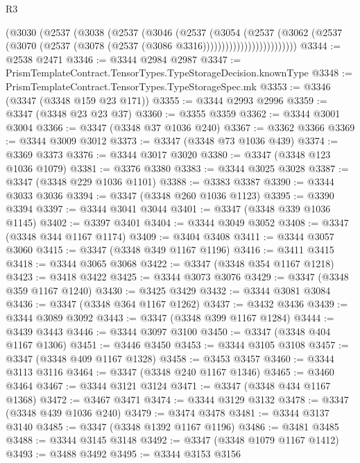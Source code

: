 \begin{lexlean}{R3}
\begin{coremodule}
                        (@3030
                          (@2537
                            (@3038
                              (@2537
                                (@3046
                                  (@2537
                                    (@3054
                                      (@2537
                                        (@3062
                                          (@2537
                                            (@3070
                                              (@2537
                                                (@3078 (@2537 (@3086 @3316)))))))))))))))))))))))))
@3344 := @2538 @2471
@3346 := @3344 @2984 @2987
@3347 := PrismTemplateContract.TensorTypes.TypeStorageDecision.knownType
@3348 := PrismTemplateContract.TensorTypes.TypeStorageSpec.mk
@3353 := @3346 (@3347 (@3348 @159 @23 @171))
@3355 := @3344 @2993 @2996
@3359 := @3347 (@3348 @23 @23 @37)
@3360 := @3355 @3359
@3362 := @3344 @3001 @3004
@3366 := @3347 (@3348 @37 @1036 @240)
@3367 := @3362 @3366
@3369 := @3344 @3009 @3012
@3373 := @3347 (@3348 @73 @1036 @439)
@3374 := @3369 @3373
@3376 := @3344 @3017 @3020
@3380 := @3347 (@3348 @123 @1036 @1079)
@3381 := @3376 @3380
@3383 := @3344 @3025 @3028
@3387 := @3347 (@3348 @229 @1036 @1101)
@3388 := @3383 @3387
@3390 := @3344 @3033 @3036
@3394 := @3347 (@3348 @260 @1036 @1123)
@3395 := @3390 @3394
@3397 := @3344 @3041 @3044
@3401 := @3347 (@3348 @339 @1036 @1145)
@3402 := @3397 @3401
@3404 := @3344 @3049 @3052
@3408 := @3347 (@3348 @344 @1167 @1174)
@3409 := @3404 @3408
@3411 := @3344 @3057 @3060
@3415 := @3347 (@3348 @349 @1167 @1196)
@3416 := @3411 @3415
@3418 := @3344 @3065 @3068
@3422 := @3347 (@3348 @354 @1167 @1218)
@3423 := @3418 @3422
@3425 := @3344 @3073 @3076
@3429 := @3347 (@3348 @359 @1167 @1240)
@3430 := @3425 @3429
@3432 := @3344 @3081 @3084
@3436 := @3347 (@3348 @364 @1167 @1262)
@3437 := @3432 @3436
@3439 := @3344 @3089 @3092
@3443 := @3347 (@3348 @399 @1167 @1284)
@3444 := @3439 @3443
@3446 := @3344 @3097 @3100
@3450 := @3347 (@3348 @404 @1167 @1306)
@3451 := @3446 @3450
@3453 := @3344 @3105 @3108
@3457 := @3347 (@3348 @409 @1167 @1328)
@3458 := @3453 @3457
@3460 := @3344 @3113 @3116
@3464 := @3347 (@3348 @240 @1167 @1346)
@3465 := @3460 @3464
@3467 := @3344 @3121 @3124
@3471 := @3347 (@3348 @434 @1167 @1368)
@3472 := @3467 @3471
@3474 := @3344 @3129 @3132
@3478 := @3347 (@3348 @439 @1036 @240)
@3479 := @3474 @3478
@3481 := @3344 @3137 @3140
@3485 := @3347 (@3348 @1392 @1167 @1196)
@3486 := @3481 @3485
@3488 := @3344 @3145 @3148
@3492 := @3347 (@3348 @1079 @1167 @1412)
@3493 := @3488 @3492
@3495 := @3344 @3153 @3156

\end{coremodule}
\end{lexlean}
